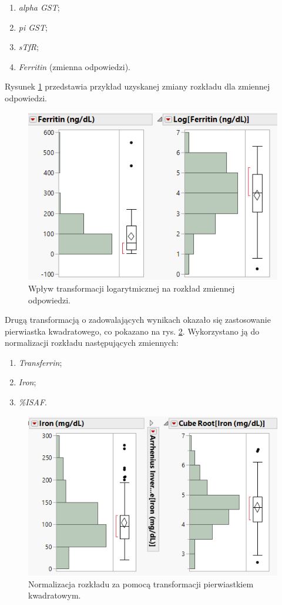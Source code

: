 	\begin{enumerate}
		\item \textit{alpha GST};
		\item \textit{pi GST};
		\item \textit{sTfR};
		\item \textit{Ferritin} (zmienna odpowiedzi).
	\end{enumerate}

	Rysunek \ref{fig:log2} przedstawia przykład uzyskanej zmiany rozkładu dla zmiennej odpowiedzi.
	
	\begin{figure}[!ht]
		\centering
		\includegraphics[width=0.7\linewidth]{Rozdzial3/log2}
		\caption{Wpływ transformacji logarytmicznej na rozkład zmiennej odpowiedzi.}
		\label{fig:log2}
	\end{figure}

	Drugą transformacją o zadowalających wynikach okazało się zastosowanie pierwiastka kwadratowego, co pokazano na rys. \ref{fig:cube2}. Wykorzystano ją do normalizacji rozkładu następujących zmiennych:
	
	\begin{enumerate}
		\item \textit{Transferrin};
		\item \textit{Iron};
		\item \textit{\%ISAF}.
	\end{enumerate}

	\begin{figure}
		\centering
		\includegraphics[width=0.7\linewidth]{Rozdzial3/cube2}
		\caption{Normalizacja rozkładu za pomocą transformacji pierwiastkiem kwadratowym.}
		\label{fig:cube2}
	\end{figure}

